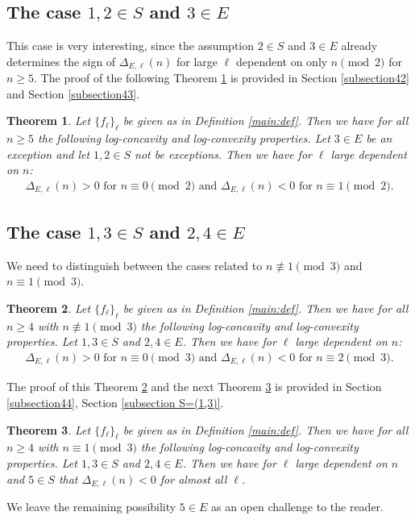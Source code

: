 \documentclass[12pt]{amsart}
\newtheorem{theorem}{Theorem}
\theoremstyle{definition}
\theoremstyle{remark}
\numberwithin{theorem}{section} \numberwithin{equation}{section}
\begin{document}
\subsection{The case $1,2 \in S $ and $3 \in E $}
This case is very interesting, since the assumption $2 \in S$ and $3 \in E$ already
determines the sign of $\Delta _{E,\ell }(n)$ for large $\ell$ dependent on only $n \pmod{2}$ for $n \geq 5$. The proof of the 
following Theorem \ref{th12} is provided in Section \ref{subsection42}
and Section \ref{subsection43}.
\begin{theorem}
\label{th12}Let $\{f_{\ell}\}_{\ell}$ be given as in Definition \ref{main:def}.
Then we have for all $n\geq 5$ the following log-concavity and log-convexity properties. Let
$3 \in E$ be an exception and let $1,2 \in S$
not be exceptions. Then we have for $\ell$ large dependent on $n$:
\begin{eqnarray*}
\Delta _{E,\ell }(n) >
0 \text{ for }n\equiv 0 \pmod{2} \text{ and }
\Delta _{E,\ell }(n) <
0 \text{ for }n\equiv 1 \pmod{2}. 
\end{eqnarray*}
\end{theorem}
\subsection{The case $1,3 \in S $ and $2,4 \in E$}
We need to distinguish between the cases related to $n \not\equiv 1 \pmod{3}$ and
$n \equiv 1 \pmod{3}$.

\begin{theorem}
\label{th13}Let $\{f_{\ell}\}_{\ell}$ be given as in Definition \ref{main:def}.
Then we have for all $n\geq 4$ with $n\not\equiv 1 \pmod{3}$ the following log-concavity and log-convexity properties. Let $1,3 \in S$ and $2,4 \in E$. Then we have for $\ell$ large dependent on $n$:
\begin{eqnarray*}
\Delta _{E,\ell }(n) >
0 \text{ for }n\equiv 0 \pmod{3} \text{ and }
\Delta_{E,\ell}(n) <
0 \text{ for }n\equiv 2 \pmod{3}. 
\end{eqnarray*}
\end{theorem}
The proof of this Theorem \ref{th13} and the next Theorem \ref{th135} is provided in Section \ref{subsection44},  Section \ref{subsection S=(1,3)}.
\begin{theorem}
\label{th135}Let $\{f_{\ell}\}_{\ell}$ be given as in Definition \ref{main:def}.
Then we have for all $n \geq 4$ with $n \equiv 1 \pmod{3}$ the following log-concavity and log-convexity properties. Let $1,3 \in S$ and $2,4 \in E$. Then we have for $\ell$ large dependent on $n$ and $5 \in S$ that
$\Delta _{E,\ell }\left( n\right) <0$ for almost all $\ell$.
\end{theorem}
We leave the remaining possibility $5 \in E$
as an open challenge to the reader.
\end{document}
